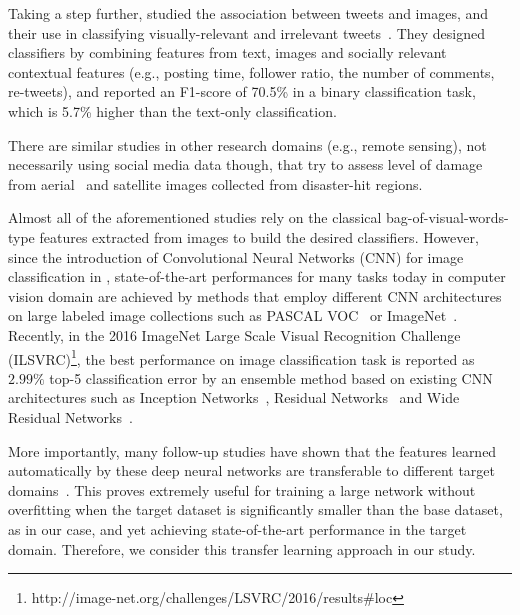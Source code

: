 \documentclass{iscram}
\begin{document}
Taking a step further, \citeauthor{chen2013understanding} studied the association between tweets and images, and their use in classifying visually-relevant and irrelevant tweets~\parencite{chen2013understanding}. They designed classifiers by combining features from text, images and socially relevant contextual features (e.g., posting time, follower ratio, the number of comments, re-tweets), and reported an F1-score of 70.5\% in a binary classification task, which is 5.7\% higher than the text-only classification.

There are similar studies in other research domains (e.g., remote sensing), not necessarily using social media data though, that try to assess level of damage from aerial~\parencite{TurkerM:IJRS04,FernandezGalarreta:2015dn} and satellite \parencite{pesaresi2007rapid,feng2014application} images collected from disaster-hit regions. 


Almost all of the aforementioned studies rely on the classical bag-of-visual-words-type features extracted from images to build the desired classifiers. However, since the introduction of Convolutional Neural Networks (CNN) for image classification in \parencite{NIPS2012_4824}, state-of-the-art performances for many tasks today in computer vision domain are achieved by methods that employ different CNN architectures on large labeled image collections such as PASCAL VOC~\parencite{Everingham10} or ImageNet~\parencite{ILSVRC15}. Recently, in the 2016 ImageNet Large Scale Visual Recognition Challenge (ILSVRC)\footnote{http://image-net.org/challenges/LSVRC/2016/results\#loc}, the best performance on image classification task is reported as $2.99\%$ top-5 classification error by an ensemble method based on existing CNN architectures such as Inception Networks~\parencite{SzegedyVISW15}, Residual Networks~\parencite{He_2016_CVPR} and Wide Residual Networks~\parencite{ZagoruykoK16}.

More importantly, many follow-up studies have shown that the features learned automatically by these deep neural networks are transferable to different target domains~\parencite{JDonahue:ICML14,Sermanet:ICLR14,Zeiler:ECCV14,RGirshick:CVPR14,MOquab:CVPR14}. This proves extremely useful for training a large network without overfitting when the target dataset is significantly smaller than the base dataset, as in our case, and yet achieving state-of-the-art performance in the target domain. Therefore, we consider this transfer learning approach in our study.
\end{document}
